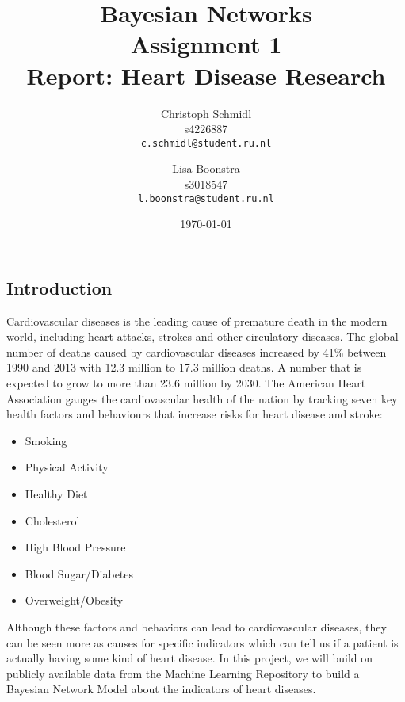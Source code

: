 \documentclass[a4paper]{article}
\title{Bayesian Networks\\Assignment 1\\Report: Heart Disease Research}
\author{
  Christoph Schmidl\\ s4226887\\      \texttt{c.schmidl@student.ru.nl}
  \and
  Lisa Boonstra\\ s3018547\\     \texttt{l.boonstra@student.ru.nl}
}
\date{\today}
\begin{document}
\maketitle


\subsection*{Introduction}

Cardiovascular diseases is the leading cause of premature death in the modern world, including heart attacks, strokes and other circulatory diseases.
The global number of deaths caused by cardiovascular diseases increased by 41\% between 1990 and 2013 with 12.3 million to 17.3 million deaths. A number that is expected to grow to more than 23.6 million by 2030.
The American Heart Association gauges the cardiovascular health of the nation by tracking seven key health factors and behaviours that increase risks for heart disease and stroke:

\vspace{1em}
\begin{varwidth}[t]{.5\textwidth}
\begin{itemize}
	\item Smoking
	\item Physical Activity
	\item Healthy Diet
\end{itemize}
\end{varwidth}%
\hspace{4em}%
\begin{varwidth}[t]{.5\textwidth}
\begin{itemize}
	\item Cholesterol
	\item High Blood Pressure
	\item Blood Sugar/Diabetes
\end{itemize}
\end{varwidth}
\hspace{4em}%
\begin{varwidth}[t]{.5\textwidth}
\begin{itemize}
	\item Overweight/Obesity
\end{itemize}
\end{varwidth}
\vspace{1em}


Although these factors and behaviors can lead to cardiovascular diseases, they can be seen more as causes for specific indicators which can tell us if a patient is actually having some kind of heart disease.
In this project, we will build on publicly available data from the Machine Learning Repository to build a Bayesian Network Model about the indicators of heart diseases.
\end{document}

